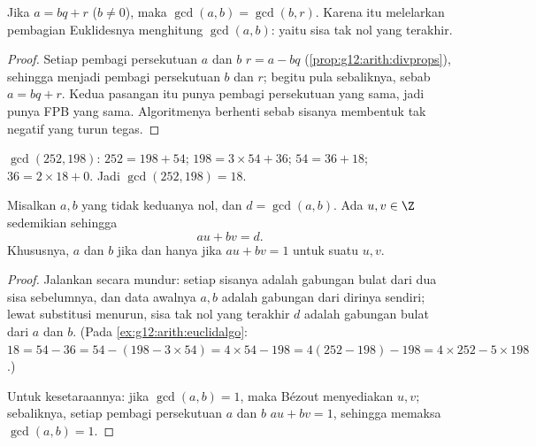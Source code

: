 \begin{proposition}\label{prop:g12:arith:euclidalgo}
Jika $a = bq + r$ ($b \neq 0$), maka $\gcd(a, b) = \gcd(b, r)$. Karena itu
melelarkan pembagian Euklidesnya menghitung $\gcd(a,b)$: yaitu sisa tak nol
yang terakhir.
\end{proposition}

\begin{proof}
Setiap pembagi persekutuan $a$ dan $b$  $r = a - bq$
(\cref{prop:g12:arith:divprops}), sehingga menjadi pembagi persekutuan $b$ dan $r$;
begitu pula sebaliknya, sebab $a = bq + r$. Kedua pasangan itu punya pembagi
persekutuan yang sama, jadi punya FPB yang sama. Algoritmenya berhenti sebab sisanya
membentuk   tak negatif yang turun tegas.
\end{proof}

\begin{example}\label{ex:g12:arith:euclidalgo}
$\gcd(252, 198)$: $252 = 198 + 54$; $198 = 3\times54 + 36$;
$54 = 36 + 18$; $36 = 2 \times 18 + 0$. Jadi $\gcd(252,198) = 18$.
\end{example}

\begin{theorem}\label{thm:g12:arith:bezout}
Misalkan $a, b$  yang tidak keduanya nol, dan $d = \gcd(a,b)$. Ada
$u, v \in \Z$ sedemikian sehingga
\[
au + bv = d .
\]
Khususnya, $a$ dan $b$  jika dan hanya jika $au + bv = 1$ untuk suatu
 $u, v$.
\end{theorem}

\begin{proof}
Jalankan  secara mundur: setiap sisanya adalah gabungan bulat
dari dua sisa sebelumnya, dan data awalnya $a, b$ adalah gabungan dari
dirinya sendiri; lewat substitusi menurun, sisa tak nol yang terakhir $d$ adalah
gabungan bulat dari $a$ dan $b$. (Pada \cref{ex:g12:arith:euclidalgo}:
$18 = 54 - 36 = 54 - (198 - 3\times54) = 4\times54 - 198 =
4(252 - 198) - 198 = 4\times252 - 5\times198$.)

Untuk kesetaraannya: jika $\gcd(a,b) = 1$, maka Bézout menyediakan $u, v$;
sebaliknya, setiap pembagi persekutuan $a$ dan $b$  $au + bv = 1$, sehingga
memaksa $\gcd(a,b) = 1$.
\end{proof}

